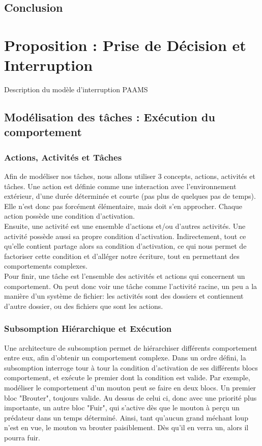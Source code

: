 \documentclass[11pt,a4paper]{report}
\begin{document}
	\section*{Conclusion}
	
\chapter{Proposition : Prise de Décision et Interruption}
	Description du modèle d'interruption PAAMS	
	
	\section{Modélisation des tâches : Exécution du comportement}	
	
		\subsection{Actions, Activités et Tâches}
			Afin de modéliser nos tâches, nous allons utiliser 3 concepts, actions, activités et tâches. Une action est définie comme une interaction avec l'environnement extérieur, d'une durée déterminée et courte (pas plus de quelques pas de temps). Elle n'est donc pas forcément élémentaire, mais doit s'en approcher. Chaque action possède une condition d'activation.\\
			Ensuite, une activité est une ensemble d'actions et/ou d'autres activités. Une activité possède aussi sa propre condition d'activation. Indirectement, tout ce qu'elle contient partage alors sa condition d'activation, ce qui nous permet de factoriser cette condition et d'alléger notre écriture, tout en permettant des comportements complexes.\\
			Pour finir, une tâche est l'ensemble des activités et actions qui concernent un comportement. On peut donc voir une tâche comme l'activité racine, un peu a la manière d'un système de fichier: les activités sont des dossiers et contiennent d'autre dossier, ou des fichiers que sont les actions.
		\subsection{Subsomption Hiérarchique et Exécution}
		
			Une architecture de subsomption permet de hiérarchiser différents comportement entre eux, afin d'obtenir un comportement complexe. Dans un ordre défini, la subsomption interroge tour à tour la condition d'activation de ses différents blocs comportement, et exécute le premier dont la condition est valide. Par exemple, modéliser le comportement d'un mouton peut se faire en deux blocs. Un premier bloc "Brouter", toujours valide. Au dessus de celui ci, donc avec une priorité plus importante, un autre bloc "Fuir", qui s'active dès que le mouton à perçu un prédateur dans un temps déterminé. Ainsi, tant qu'aucun grand méchant loup n'est en vue, le mouton va brouter paisiblement. Dès qu'il en verra un, alors il pourra fuir.
			
\end{document}

